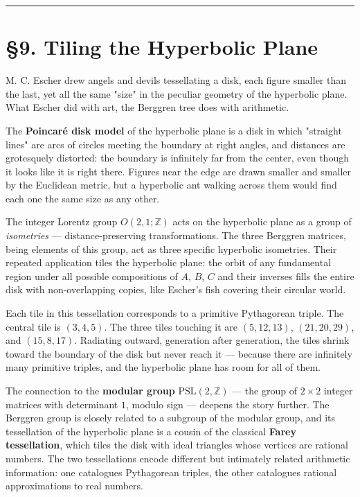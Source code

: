 \documentclass[12pt, letterpaper, openany]{book}
\theoremstyle{definition}
\theoremstyle{remark}
\begin{document}
\bigskip\noindent\rule{\textwidth}{0.4pt}\bigskip



\section*{§9. Tiling the Hyperbolic Plane}


M. C. Escher drew angels and devils tessellating a disk, each figure smaller than the last, yet all the same "size" in the peculiar geometry of the hyperbolic plane. What Escher did with art, the Berggren tree does with arithmetic.

The \textbf{Poincaré disk model} of the hyperbolic plane is a disk in which "straight lines" are arcs of circles meeting the boundary at right angles, and distances are grotesquely distorted: the boundary is infinitely far from the center, even though it looks like it is right there. Figures near the edge are drawn smaller and smaller by the Euclidean metric, but a hyperbolic ant walking across them would find each one the same size as any other.

The integer Lorentz group $O(2,1; \mathbb{Z})$ acts on the hyperbolic plane as a group of \textit{isometries} --- distance-preserving transformations. The three Berggren matrices, being elements of this group, act as three specific hyperbolic isometries. Their repeated application tiles the hyperbolic plane: the orbit of any fundamental region under all possible compositions of $A$, $B$, $C$ and their inverses fills the entire disk with non-overlapping copies, like Escher's fish covering their circular world.

Each tile in this tessellation corresponds to a primitive Pythagorean triple. The central tile is $(3, 4, 5)$. The three tiles touching it are $(5, 12, 13)$, $(21, 20, 29)$, and $(15, 8, 17)$. Radiating outward, generation after generation, the tiles shrink toward the boundary of the disk but never reach it --- because there are infinitely many primitive triples, and the hyperbolic plane has room for all of them.

The connection to the \textbf{modular group} $\text{PSL}(2, \mathbb{Z})$ --- the group of $2 \times 2$ integer matrices with determinant $1$, modulo sign --- deepens the story further. The Berggren group is closely related to a subgroup of the modular group, and its tessellation of the hyperbolic plane is a cousin of the classical \textbf{Farey tessellation}, which tiles the disk with ideal triangles whose vertices are rational numbers. The two tessellations encode different but intimately related arithmetic information: one catalogues Pythagorean triples, the other catalogues rational approximations to real numbers.
\end{document}
